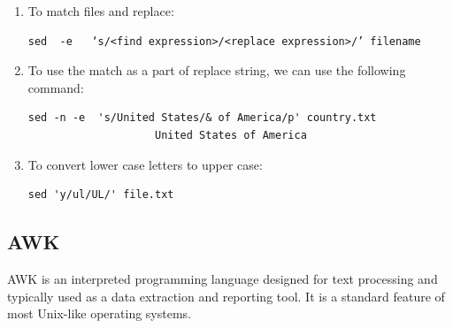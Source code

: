 \documentclass{article}
\begin{document}
    \begin{enumerate}
        \item
            To match files and replace:
                \begin{lstlisting}[style=BashInputStyle]
                     sed  -e   ‘s/<find expression>/<replace expression>/’ filename
                \end{lstlisting}
        \item
            To use the match as a part of replace string, we can use the following command:
                \begin{lstlisting}[style=BashInputStyle]
                    sed -n -e  's/United States/& of America/p' country.txt
                    United States of America
                \end{lstlisting}
          \item
            To convert lower case letters to upper case:
                \begin{lstlisting}[style=BashInputStyle]
                    sed 'y/ul/UL/' file.txt
                \end{lstlisting}
  \end{enumerate}
  \subsection{AWK}
AWK is an interpreted programming language designed for text processing and typically used as a data extraction and reporting tool. It is a standard feature of most Unix-like operating systems.
\end{document}

